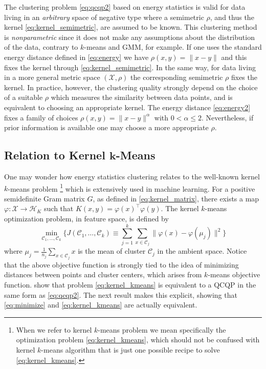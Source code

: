 \documentclass[aps,preprint,nofootinbib,floatfix]{revtex4-1}
\newcommand\kk{K}
\newcommand\HH{\mathcal{H}}
\newcommand\C{{\mathcal{C}}}
\begin{document}

The clustering problem \eqref{eq:qcqp2} based on energy statistics
is valid for data living in an \emph{arbitrary} space of negative type where
a semimetric $\rho$, and thus the kernel \eqref{eq:kernel_semimetric}, are
assumed to be known. This clustering method is
\emph{nonparametric} since it does not make any assumptions
about  the distribution of the data, 
contrary to $k$-means and GMM, for example.
If one uses the standard energy distance
defined in \eqref{eq:energy} 
we have $\rho(x,y) = \| x - y\|$ and this fixes the kernel
through \eqref{eq:kernel_semimetric}. In the same way, 
for data living in a more general
metric space $(\mathcal{X}, \rho)$ the corresponding semimetric $\rho$ fixes
the kernel.
In practice, however,
the clustering quality strongly depend on the choice of a suitable
$\rho$ which measures the similarity between data points,
and is equivalent to choosing an appropriate kernel.
The energy distance \eqref{eq:energy2} fixes a family of choices
$\rho(x,y) = \| x-y\|^\alpha$ with $0 < \alpha\le 2$. 
Nevertheless, if prior information
is available one may choose a more appropriate $\rho$.

\subsection*{Relation to Kernel $\bm{k}$-Means}
One may wonder how energy statistics clustering 
relates to the well-known kernel $k$-means problem%
\footnote{When we refer to kernel $k$-means problem we mean specifically 
the optimization problem \eqref{eq:kernel_kmeans}, which should not be 
confused with kernel $k$-means algorithm that is just one possible recipe 
to solve \eqref{eq:kernel_kmeans}.
} 
which is extensively used in machine learning.
For a positive semidefinite Gram matrix $G$, as defined in
\eqref{eq:kernel_matrix},
there exists a map
$\varphi: \mathcal{X} \to \HH_\kk$ such that
$\kk(x,y) = \varphi(x)^\top \varphi(y)$. The kernel $k$-means optimization
problem,
in feature space,
is defined by
\begin{equation}
\label{eq:kernel_kmeans}
\min_{\C_1,\dotsc,\C_k}\bigg\{ 
J(\C_1,\dots,\C_k) \equiv  \sum_{j=1}^k
\sum_{x \in \C_j} \| \varphi(x) - \varphi(\mu_j) \|^2
\bigg\}
\end{equation}
where $\mu_j = \tfrac{1}{n_j} \sum_{x \in \C_j} x$ is the  mean of cluster
$\C_j$ in the ambient space. Notice that the above objective function
is strongly tied to the idea of minimizing distances between points
and cluster centers, which arises from $k$-means objective function.
 \cite{Dhillon2,Dhillon} show
that problem \eqref{eq:kernel_kmeans} 
is equivalent to a QCQP in the same form as
\eqref{eq:qcqp2}. The next result makes this explicit, showing that
\eqref{eq:minimize} and \eqref{eq:kernel_kmeans} are actually equivalent.
\end{document}
